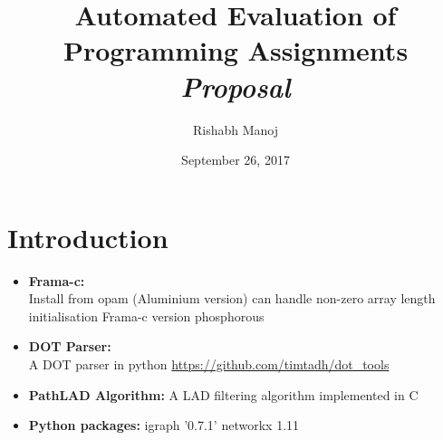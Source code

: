\documentclass{article}
\title{Automated Evaluation of Programming Assignments \\ \vspace{0.5mm} \large\textit{Proposal}}
\author{Rishabh Manoj}
\date{September 26, 2017}
\begin{document}
\maketitle
\section{Introduction}

\begin{itemize}
    \item \textbf{Frama-c:} \\
                Install from opam (Aluminium version) can handle non-zero array length initialisation
                Frama-c version phosphorous
    \item \textbf{DOT Parser:}\\
               A DOT parser in python \url{https://github.com/timtadh/dot\_tools}
    \item \textbf{PathLAD Algorithm:}
                A LAD filtering algorithm implemented in C
    \item \textbf{Python packages:}
                igraph '0.7.1'
                networkx 1.11
                
\end{itemize}
\end{document}
